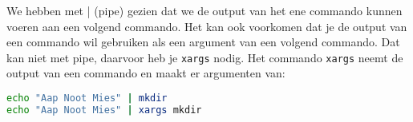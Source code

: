 We hebben met | (pipe) gezien dat we de output van het ene commando kunnen voeren aan een volgend commando. Het kan ook voorkomen dat je de output van een commando wil gebruiken als een argument van een volgend commando. Dat kan niet met pipe, daarvoor heb je \texttt{xargs} nodig. Het commando \texttt{xargs} neemt de output van een commando en maakt er argumenten van:
\begin{lstlisting}[language=bash]
echo "Aap Noot Mies" | mkdir
echo "Aap Noot Mies" | xargs mkdir
\end{lstlisting}

